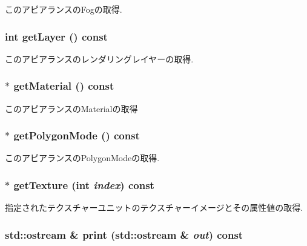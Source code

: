 このアピアランスのFogの取得. \hypertarget{classm3g_1_1Appearance_df831e0e0ebf9d7e997150e497e6a6cf}{
\subsubsection[{getLayer}]{\setlength{\rightskip}{0pt plus 5cm}int getLayer () const}}
\label{classm3g_1_1Appearance_df831e0e0ebf9d7e997150e497e6a6cf}


このアピアランスのレンダリングレイヤーの取得. \hypertarget{classm3g_1_1Appearance_a412c7074ed5d51f6b8b6fd89275c405}{
\subsubsection[{getMaterial}]{ $\ast$ getMaterial () const}}
\label{classm3g_1_1Appearance_a412c7074ed5d51f6b8b6fd89275c405}


このアピアランスのMaterialの取得 \hypertarget{classm3g_1_1Appearance_dd3ddcefcd18339150d281b155602886}{
\subsubsection[{getPolygonMode}]{ $\ast$ getPolygonMode () const}}
\label{classm3g_1_1Appearance_dd3ddcefcd18339150d281b155602886}


このアピアランスのPolygonModeの取得. \hypertarget{classm3g_1_1Appearance_987cc21bd78d0e4e664da717479bdd57}{
\subsubsection[{getTexture}]{ $\ast$ getTexture (int {\em index}) const}}
\label{classm3g_1_1Appearance_987cc21bd78d0e4e664da717479bdd57}


指定されたテクスチャーユニットのテクスチャーイメージとその属性値の取得. \hypertarget{classm3g_1_1Appearance_6fea17fa1532df3794f8cb39cb4f911f}{
\subsubsection[{print}]{\setlength{\rightskip}{0pt plus 5cm}std::ostream \& print (std::ostream \& {\em out}) const}}
\label{classm3g_1_1Appearance_6fea17fa1532df3794f8cb39cb4f911f}


